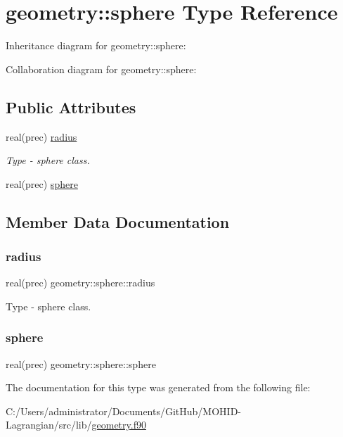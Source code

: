 \hypertarget{structgeometry_1_1sphere}{}\section{geometry\+:\+:sphere Type Reference}
\label{structgeometry_1_1sphere}


Inheritance diagram for geometry\+:\+:sphere\+:


Collaboration diagram for geometry\+:\+:sphere\+:
\subsection*{Public Attributes}
\begin{DoxyCompactItemize}
\item 
real(prec) \mbox{\hyperlink{structgeometry_1_1sphere_a906fbbdb8c6b56e7d45cea4e96b6e04d}{radius}}
\begin{DoxyCompactList}\small\item\em Type -\/ sphere class. \end{DoxyCompactList}\item 
real(prec) \mbox{\hyperlink{structgeometry_1_1sphere_adfb4bd59ba6d8b43aa9d4ab20e0b65ed}{sphere}}
\end{DoxyCompactItemize}


\subsection{Member Data Documentation}
\mbox{\label{structgeometry_1_1sphere_a906fbbdb8c6b56e7d45cea4e96b6e04d}} 
\subsubsection{\texorpdfstring{radius}{radius}}
{\footnotesize\ttfamily real(prec) geometry\+::sphere\+::radius}



Type -\/ sphere class. 

\mbox{\label{structgeometry_1_1sphere_adfb4bd59ba6d8b43aa9d4ab20e0b65ed}} 
\subsubsection{\texorpdfstring{sphere}{sphere}}
{\footnotesize\ttfamily real(prec) geometry\+::sphere\+::sphere}



The documentation for this type was generated from the following file\+:\begin{DoxyCompactItemize}
\item 
C\+:/\+Users/administrator/\+Documents/\+Git\+Hub/\+M\+O\+H\+I\+D-\/\+Lagrangian/src/lib/\mbox{\hyperlink{geometry_8f90}{geometry.\+f90}}\end{DoxyCompactItemize}
